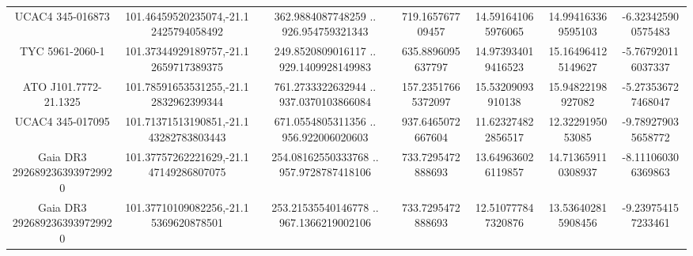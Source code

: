 \begin{table}
\begin{tabular}{ccccccc}
UCAC4 345-016873 & 101.46459520235074,-21.12425794058492 & 362.9884087748259 .. 926.954759321343 & 719.165767709457 & 14.591641065976065 & 14.994163369595103 & -6.323425900575483 \\
TYC 5961-2060-1 & 101.37344929189757,-21.12659717389375 & 249.8520809016117 .. 929.1409928149983 & 635.8896095637797 & 14.973934019416523 & 15.164964125149627 & -5.767920116037337 \\
ATO J101.7772-21.1325 & 101.78591653531255,-21.12832962399344 & 761.2733322632944 .. 937.0370103866084 & 157.23517665372097 & 15.53209093910138 & 15.94822198927082 & -5.273536727468047 \\
UCAC4 345-017095 & 101.71371513190851,-21.143282783803443 & 671.0554805311356 .. 956.922006020603 & 937.6465072667604 & 11.623274822856517 & 12.3229195053085 & -9.789279035658772 \\
Gaia DR3 2926892363939729920 & 101.37757262221629,-21.147149286807075 & 254.08162550333768 .. 957.9728787418106 & 733.7295472888693 & 13.649636026119857 & 14.713659110308937 & -8.111060306369863 \\
Gaia DR3 2926892363939729920 & 101.37710109082256,-21.15369620878501 & 253.21535540146778 .. 967.1366219002106 & 733.7295472888693 & 12.510777847320876 & 13.536402815908456 & -9.239754157233461 \\
\end{tabular}
\end{table}
